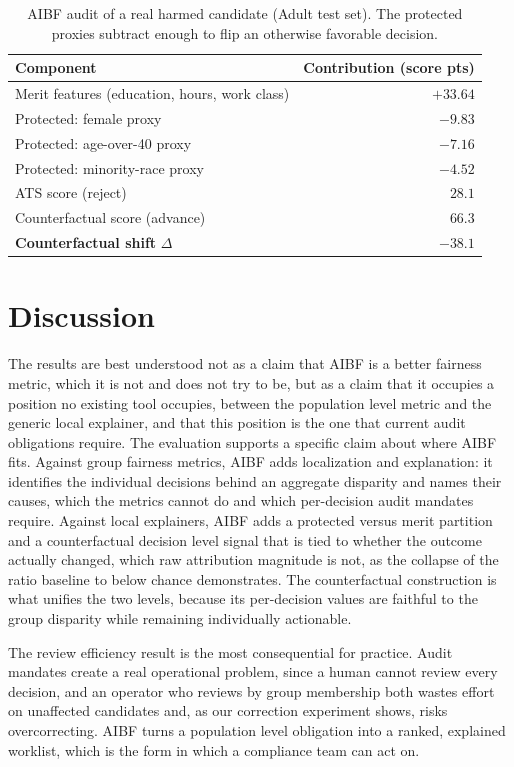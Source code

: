 \documentclass[conference]{IEEEtran}
\begin{document}
\begin{table}[t]
\caption{AIBF audit of a real harmed candidate (Adult test set). The protected proxies
subtract enough to flip an otherwise favorable decision.}
\label{tab:example}
\centering
\footnotesize
\begin{tabular}{@{}lr@{}}
\toprule
Component & Contribution (score pts) \\
\midrule
Merit features (education, hours, work class) & $+33.64$ \\
Protected: female proxy       & $-9.83$ \\
Protected: age-over-40 proxy  & $-7.16$ \\
Protected: minority-race proxy & $-4.52$ \\
\midrule
ATS score (reject)            & $28.1$ \\
Counterfactual score (advance) & $66.3$ \\
\textbf{Counterfactual shift} $\Delta$ & $\mathbf{-38.1}$ \\
\bottomrule
\end{tabular}
\end{table}

\section{Discussion}
\label{sec:disc}
The results are best understood not as a claim that AIBF is a better fairness metric,
which it is not and does not try to be, but as a claim that it occupies a position no
existing tool occupies, between the population level metric and the generic local
explainer, and that this position is the one that current audit obligations
require. The evaluation supports a specific claim about where AIBF fits. Against group fairness
metrics, AIBF adds localization and explanation: it identifies the individual
decisions behind an aggregate disparity and names their causes, which the metrics
cannot do and which per-decision audit mandates require. Against local explainers,
AIBF adds a protected versus merit partition and a counterfactual decision
level signal that is tied to whether the outcome actually changed, which raw
attribution magnitude is not, as the collapse of the ratio baseline to below chance
demonstrates. The counterfactual construction is what unifies the two levels, because
its per-decision values are faithful to the group disparity while remaining
individually actionable.

The review efficiency result is the most consequential for practice. Audit mandates
create a real operational problem, since a human cannot review every decision, and an
operator who reviews by group membership both wastes effort on unaffected candidates
and, as our correction experiment shows, risks overcorrecting. AIBF turns a population
level obligation into a ranked, explained worklist, which is the form in which a
compliance team can act on.
\end{document}
